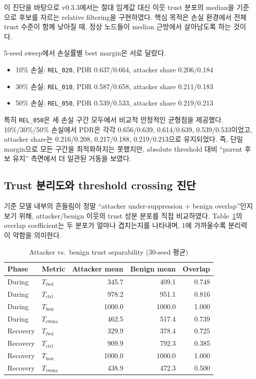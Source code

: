 \documentclass[12pt,a4paper]{article}
\begin{document}
이 진단을 바탕으로 v0.3.3에서는 절대 임계값 대신
이웃 trust 분포의 median을 기준으로 후보를 자르는 relative filtering을 구현하였다.
핵심 목적은 손실 환경에서 전체 trust 수준이 함께 낮아질 때,
정상 노드들이 median 근방에서 살아남도록 하는 것이다.

5-seed sweep에서 손실률별 best margin은 서로 달랐다.
\begin{itemize}
  \item 10\% 손실: \texttt{REL\_020}, PDR 0.637/0.664, attacker share 0.206/0.184
  \item 30\% 손실: \texttt{REL\_010}, PDR 0.587/0.658, attacker share 0.211/0.183
  \item 50\% 손실: \texttt{REL\_050}, PDR 0.539/0.533, attacker share 0.219/0.213
\end{itemize}

특히 \texttt{REL\_050}은 세 손실 구간 모두에서 비교적 안정적인 균형점을 제공했다.
10\%/30\%/50\% 손실에서 PDR은 각각 0.656/0.639, 0.614/0.639, 0.539/0.533이었고,
attacker share는 0.216/0.208, 0.217/0.188, 0.219/0.213으로 유지되었다.
즉, 단일 margin으로 모든 구간을 최적화하지는 못했지만,
absolute threshold 대비 ``parent 후보 유지'' 측면에서 더 일관된 거동을 보였다.

\subsection{Trust 분리도와 threshold crossing 진단}

기준 모델 내부의 흔들림이 정말 ``attacker under-suppression + benign overlap''인지 보기 위해,
attacker/benign 이웃의 trust 성분 분포를 직접 비교하였다.
Table~\ref{tab:trust-separability}의 overlap coefficient는 두 분포가 얼마나 겹치는지를 나타내며,
1에 가까울수록 분리력이 약함을 의미한다.

\begin{table}[t]
  \centering
  \caption{Attacker vs.\ benign trust separability (30-seed 평균)}
  \label{tab:trust-separability}
  \begin{tabular}{llrrr}
    \toprule
    Phase & Metric & Attacker mean & Benign mean & Overlap \\
    \midrule
    During   & $T_\text{fwd}$  & 345.7 & 409.1 & 0.748 \\
    During   & $T_\text{ctrl}$ & 978.2 & 951.1 & 0.816 \\
    During   & $T_\text{hon}$  & 1000.0 & 1000.0 & 1.000 \\
    During   & $T_\text{ewma}$ & 462.5 & 517.4 & 0.739 \\
    \midrule
    Recovery & $T_\text{fwd}$  & 329.9 & 378.4 & 0.725 \\
    Recovery & $T_\text{ctrl}$ & 909.9 & 792.3 & 0.385 \\
    Recovery & $T_\text{hon}$  & 1000.0 & 1000.0 & 1.000 \\
    Recovery & $T_\text{ewma}$ & 438.9 & 472.3 & 0.500 \\
    \bottomrule
  \end{tabular}
\end{table}
\end{document}

